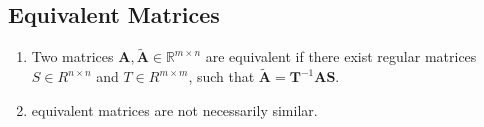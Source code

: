 \subsection{Equivalent Matrices}

\begin{enumerate}
    \item 
    \begin{definition}
        Two matrices $\bm{A}, \tilde{\bm{A}} \in \mathbb{R}^{m\times n}$ are equivalent if there exist regular matrices $S \in R^{n\times n}$ and $T \in R^{m\times m}$, such that $\tilde{\bm{A}} = \bm{T} ^{-1}\bm{AS}$.
        \hfill \cite{mfml/book/mml/Deisenroth-Faisal-Ong}
    \end{definition}

    \item equivalent matrices are not necessarily similar. 
    \hfill \cite{mfml/book/mml/Deisenroth-Faisal-Ong}
\end{enumerate}














